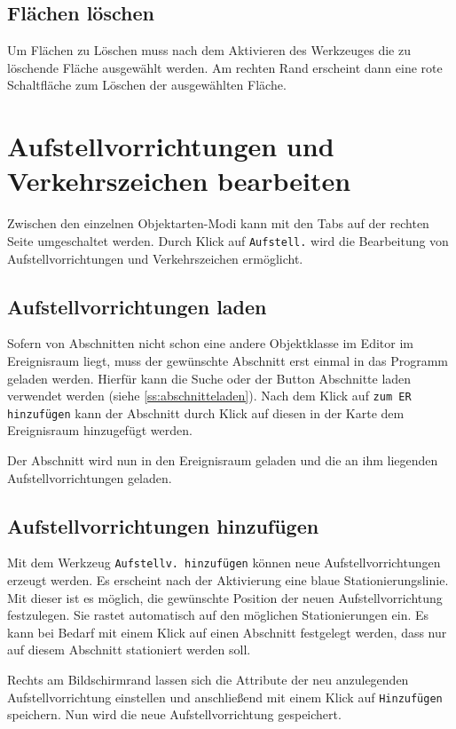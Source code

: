 \documentclass[a4paper,11pt,bibliography=totoc, listof=totoc,titlepage]{scrartcl}
\begin{document}
\subsection{Flächen löschen}
Um Flächen zu Löschen muss nach dem Aktivieren des Werkzeuges die zu löschende Fläche ausgewählt werden. Am rechten Rand erscheint dann eine rote Schaltfläche zum Löschen der ausgewählten Fläche.

\section{Aufstellvorrichtungen und Verkehrszeichen bearbeiten}
\label{s:schilder}
Zwischen den einzelnen Objektarten-Modi kann mit den Tabs auf der rechten Seite umgeschaltet werden. Durch Klick auf \verb|Aufstell.| wird die Bearbeitung von Aufstellvorrichtungen und Verkehrszeichen ermöglicht.

\subsection{Aufstellvorrichtungen laden}
Sofern von Abschnitten nicht schon eine andere Objektklasse im Editor im Ereignisraum liegt, muss der gewünschte Abschnitt erst einmal in das Programm geladen werden. Hierfür kann die Suche oder der Button Abschnitte laden verwendet werden (siehe \autoref{ss:abschnitteladen}). Nach dem Klick auf \verb|zum ER hinzufügen| kann der Abschnitt durch Klick auf diesen in der Karte dem Ereignisraum hinzugefügt werden.

Der Abschnitt wird nun in den Ereignisraum geladen und die an ihm liegenden Aufstellvorrichtungen geladen.

\subsection{Aufstellvorrichtungen hinzufügen}
Mit dem Werkzeug \verb|Aufstellv. hinzufügen| können neue Aufstellvorrichtungen erzeugt werden. Es erscheint nach der Aktivierung eine blaue Stationierungslinie. Mit dieser ist es möglich, die gewünschte Position der neuen Aufstellvorrichtung festzulegen. Sie rastet automatisch auf den möglichen Stationierungen ein. Es kann bei Bedarf mit einem Klick auf einen Abschnitt festgelegt werden, dass nur auf diesem Abschnitt stationiert werden soll.

Rechts am Bildschirmrand lassen sich die Attribute der neu anzulegenden Aufstellvorrichtung einstellen und anschließend mit einem Klick auf \verb|Hinzufügen| speichern. Nun wird die neue Aufstellvorrichtung gespeichert.
\end{document}
